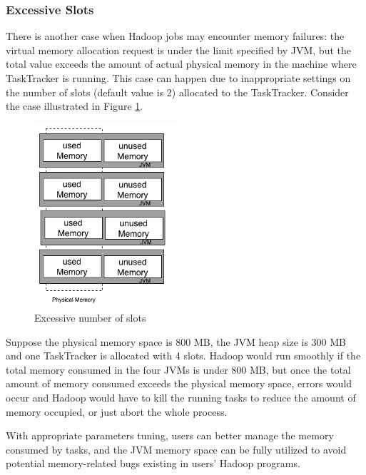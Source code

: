 \subsubsection{Excessive Slots}
There is another case when Hadoop jobs may encounter memory failures: the virtual memory allocation request is under the limit specified by JVM, but the total value exceeds the amount of actual physical memory in the machine where TaskTracker is running.
This case can happen due to inappropriate settings on the number of slots (default value is 2) allocated to the TaskTracker. Consider the case illustrated in Figure \ref{ref:excessive_slots}.
\begin{figure}[ht]
  \centering
    \includegraphics[width=2.1in]{image/excessive_Slots.png}
    \caption{Excessive number of slots}
    \label{ref:excessive_slots}
\end{figure}
\par
Suppose the physical memory space is 800 MB, the JVM heap size is 300 MB and one TaskTracker is allocated with 4 slots. Hadoop would run smoothly if the total memory consumed in the four JVMs is under 800 MB, but once the total amount of memory consumed exceeds the physical memory space, errors would occur and Hadoop would have to kill the running tasks to reduce the amount of memory occupied, or just abort the whole process.
\par
With appropriate parameters tuning, users can better manage the memory consumed by tasks, and the JVM memory space can be fully utilized to avoid potential memory-related bugs existing in users' Hadoop programs.

